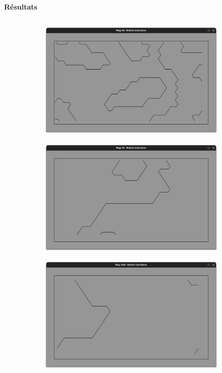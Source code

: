 \documentclass[aspectratio=169,10pt]{beamer}
\begin{document}
\begin{frame}{\textbf{Résultats}}
\begin{columns}
\begin{column}{0.2\textwidth}
\begin{figure}[H]
\begin{subfigure}[b]{0.8\textwidth}
					\centering
					\includegraphics[width=\textwidth]{IMAGES/map40.png}
				\end{subfigure}
				\vfill
				\begin{subfigure}[b]{0.8\textwidth}
					\centering
					\includegraphics[width=\textwidth]{IMAGES/map55.png}
				\end{subfigure}
				\vfill
				\begin{subfigure}[b]{0.8\textwidth}
					\centering
					\includegraphics[width=\textwidth]{IMAGES/map100.png}
				\end{subfigure}
			\end{figure}
		\end{column}
	\end{columns}
\end{frame}
\end{document}
